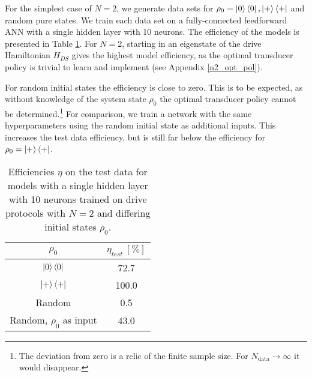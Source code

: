 For the simplest case of $N = 2$, we generate data sets for $\rho_0 = \ket{0} \bra{0}, \ket{+} \bra{+}$ and random pure states.
We train each data set on a fully-connected feedforward ANN with a single hidden layer with 10 neurons.
The efficiency of the models is presented in Table \ref{n2efftable}.
For $N = 2$, starting in an eigenstate of the drive Hamiltonian $H_{DS}$ gives the highest model efficiency, as the optimal transducer policy is trivial to learn and implement (see Appendix \ref{n2_opt_pol}).

For random initial states the efficiency is close to zero.
This is to be expected, as without knowledge of the system state $\rho_0$ the optimal transducer policy cannot be determined.\footnote{The deviation from zero is a relic of the finite sample size. For $N_{\mathrm{data}} \to \infty$ it would disappear.}
For comparison, we train a network with the same hyperparameters using the random initial state as additional inputs.
This increases the test data efficiency, but is still far below the efficiency for $\rho_0 = \ket{+} \bra{+}$.


\begin{table}[h]
	\centering
	\begin{tabular}{ c | c }
		$\rho_0$ & $\eta_{test} \ [\%]$ \\
		\hline
		$\ket{0} \bra{0}$ & 72.7 \\
		$\ket{+} \bra{+}$ & 100.0 \\
		Random & 0.5 \\
		Random, $\rho_0$ as input & 43.0 \\
	\end{tabular}
	\caption{Efficiencies $\eta$ on the test data for models with a single hidden layer with 10 neurons trained on drive protocols with $N = 2$ and differing initial states $\rho_0$.}
	\label{n2efftable}
\end{table}
